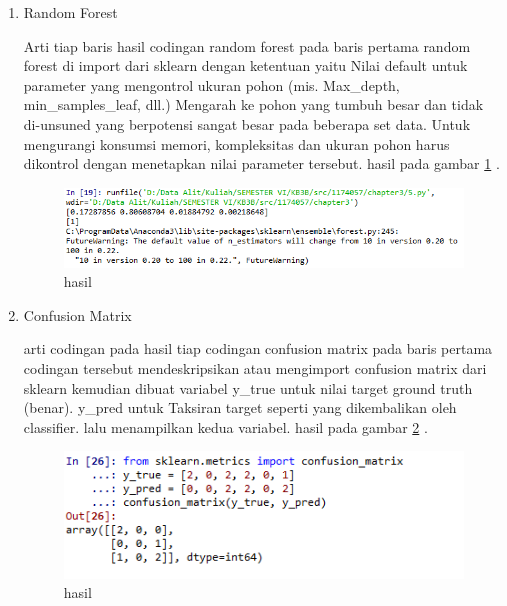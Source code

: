 \begin{enumerate}
\item Random Forest\par
Arti tiap baris hasil codingan random forest pada baris pertama random forest di import dari sklearn dengan ketentuan yaitu Nilai default untuk parameter yang mengontrol ukuran pohon (mis. Max\_depth, min\_samples\_leaf, dll.) Mengarah ke pohon yang tumbuh besar dan tidak di-unsuned yang berpotensi sangat besar pada beberapa set data. Untuk mengurangi konsumsi memori, kompleksitas dan ukuran pohon harus dikontrol dengan menetapkan nilai parameter tersebut. hasil pada gambar \ref{contoh4} . 

\begin{figure}[ht]
\centering
\includegraphics[scale=0.5]{figures/1174057/chapter3/8.PNG}
\caption{hasil}
\label{contoh4}
\end{figure}

\item Confusion Matrix\par
arti codingan pada hasil tiap codingan confusion matrix pada baris pertama codingan tersebut mendeskripsikan atau mengimport confusion matrix dari sklearn kemudian dibuat variabel y\_true untuk nilai target ground truth (benar). y\_pred untuk Taksiran target seperti yang dikembalikan oleh classifier. lalu menampilkan kedua variabel. hasil pada gambar \ref{contoh5} .

\begin{figure}[ht]
\centering
\includegraphics[scale=0.5]{figures/1174057/chapter3/9.PNG}
\caption{hasil}
\label{contoh5}
\end{figure}


\end{enumerate}
